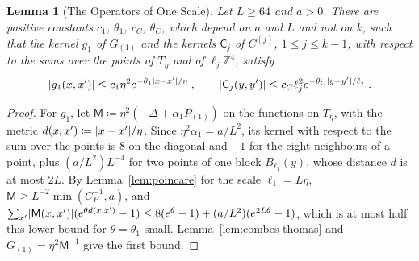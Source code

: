 \documentclass[11pt]{preprint}
\DeclarePairedDelimiter{\abs}{\lvert}{\rvert}
\numberwithin{equation}{section}
\newtheorem{lemma}[theorem]{Lemma}
\theoremstyle{definition}
\theoremstyle{remark}
\theoremstyle{plain}
\begin{document}
\begin{lemma}[The Operators of One Scale]\label{lem:one-scale}
Let $L \geq 64$ and $a > 0$. There are positive constants $c_1$, $\theta_1$, $c_C$, $\theta_C$, which depend on $a$ and $L$ and not on $k$, such that the kernel $g_1$ of $G_{(1)}$ and the kernels $\mathsf C_j$ of $C^{(j)}$, $1 \leq j \leq k - 1$, with respect to the sums over the points of $T_\eta$ and of $\ell_j\mathbb Z^4$, satisfy
\begin{equation}\label{eq:one-scale}
    \abs{g_1(x, x')} \leq c_1\eta^2e^{-\theta_1\abs{x - x'}/\eta}\;,
    \qquad
    \abs{\mathsf C_j(y, y')} \leq c_C\ell_j^2e^{-\theta_C\abs{y - y'}/\ell_j}\;.
\end{equation}
\end{lemma}

\begin{proof}
For $g_1$, let $\mathsf M \coloneqq \eta^2(-\Delta + \alpha_1P_{(1)})$ on the functions on $T_\eta$, with the metric $d(x, x') \coloneqq \abs{x - x'}/\eta$. Since $\eta^2\alpha_1 = a/L^2$, its kernel with respect to the sum over the points is $8$ on the diagonal and $-1$ for the eight neighbours of a point, plus $(a/L^2)L^{-4}$ for two points of one block $B_{\ell_1}(y)$, whose distance $d$ is at most $2L$. By Lemma~\ref{lem:poincare} for the scale $\ell_1 = L\eta$, $\mathsf M \geq L^{-2}\min(C_P^{-1}, a)$, and $\sum_{x'}\abs{\mathsf M(x, x')}(e^{\theta d(x, x')} - 1) \leq 8(e^\theta - 1) + (a/L^2)(e^{2L\theta} - 1)$, which is at most half this lower bound for $\theta = \theta_1$ small. Lemma~\ref{lem:combes-thomas} and $G_{(1)} = \eta^2\mathsf M^{-1}$ give the first bound.


\end{proof}
\end{document}
